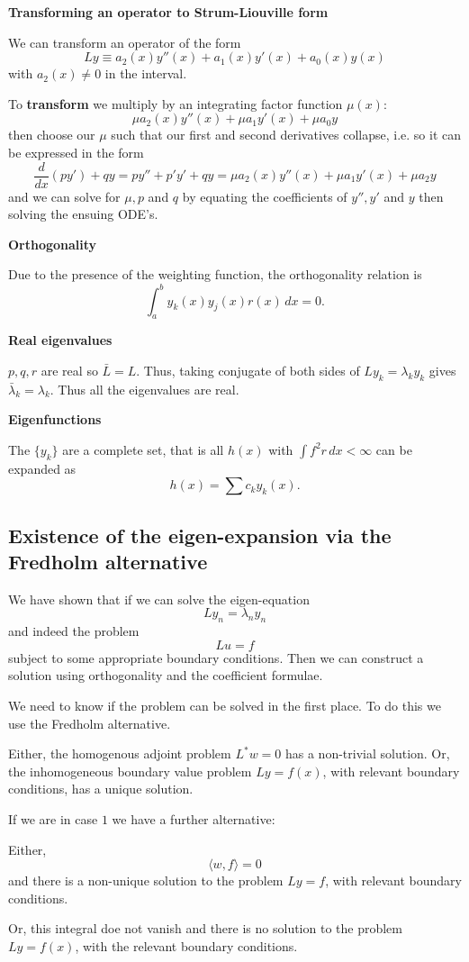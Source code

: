 \documentclass[10pt, a4paper]{article}
\begin{document}
\textbf{Transforming an operator to Strum-Liouville form}

We can transform an operator of the form
\[
Ly \equiv a_2(x)y''(x) + a_1(x)y'(x) + a_0(x)y(x)
\]
with $a_2(x) \neq 0$ in the interval.

To \textbf{transform} we multiply by an integrating factor function $\mu(x)$:
\[
\mu a_2(x)y''(x) + \mu a_1y'(x) + \mu a_0y
\]
then choose our $\mu$ such that our first and second derivatives collapse,
i.e. so it can be expressed in the form
\[
\frac{d}{dx}(py') + qy = py'' + p'y' + qy = \mu a_2(x)y''(x) + \mu a_1y'(x) + \mu a_2y
\]
and we can solve for $\mu, p$ and $q$ by equating the coefficients of $y'', y'$ and $y$ then solving the ensuing ODE's.


\textbf{Orthogonality}

Due to the presence of the weighting function,
the orthogonality relation is
\[
\int_{a}^{b}y_k(x)y_j(x)r(x)\,dx = 0.
\]

\textbf{Real eigenvalues}

$p, q, r$ are real so $\bar{L} = L$.
Thus,
taking conjugate of both sides of $Ly_k = \lambda_ky_k$ gives
$\bar{\lambda}_k = \lambda_k$.
Thus all the eigenvalues are real.

\textbf{Eigenfunctions}

The $\{y_k\}$ are a complete set,
that is all $h(x)$ with $\int f  ^ 2r\,dx < \infty$ can be expanded as
\[
h(x) = \sum c_ky_k(x).
\]

\subsection{Existence of the eigen-expansion via the Fredholm alternative}
We have shown that if we can solve the eigen-equation
\[
Ly_n = \lambda_ny_n
\]
and indeed the problem
\[
Lu = f
\]
subject to some appropriate boundary conditions.
Then we can construct a solution using orthogonality and the coefficient formulae.

We need to know if the problem can be solved in the first place.
To do this we use the Fredholm alternative.

\begin{proposition}
    Either,
    the homogenous adjoint problem $L ^ {*}w = 0$ has a non-trivial solution.
    Or,
    the inhomogeneous boundary value problem $Ly = f(x)$,
    with relevant boundary conditions,
    has a unique solution.
\end{proposition}

If we are in case $1$ we have a further alternative:
\begin{proposition}
    Either,
    \[
    \langle w, f\rangle = 0
    \]
    and there is a non-unique solution to the problem $Ly = f$,
    with relevant boundary conditions.

    Or,
    this integral doe not vanish and there is no solution to the problem $Ly = f(x)$,
    with the relevant boundary conditions.
\end{proposition}
\end{document}
